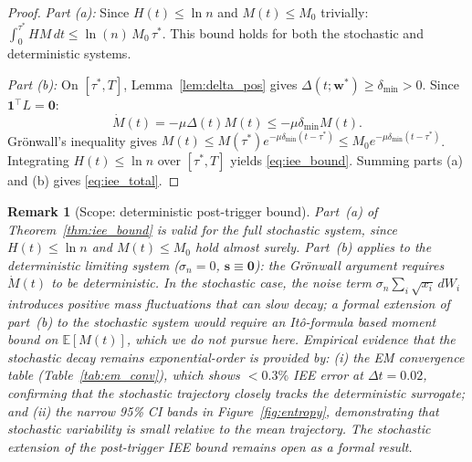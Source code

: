 \documentclass[review,12pt]{elsarticle}
\newcommand{\bfw}{\mathbf{w}}
\newtheorem{remark}{Remark}
\begin{document}
\begin{proof}
\emph{Part (a):} Since $H(t) \leq \ln n$ and $M(t) \leq M_0$ trivially:
$\int_0^{\tau^*} H M\,dt \leq \ln(n)\,M_0\,\tau^*$.
This bound holds for both the stochastic and deterministic systems.

\emph{Part (b):} On $[\tau^*,T]$, Lemma~\ref{lem:delta_pos} gives
$\Delta(t;\bfw^*) \geq \delta_{\min} > 0$.
Since $\mathbf{1}^\top L = \mathbf{0}$:
\[
  \dot{M}(t) = -\mu\Delta(t)M(t) \leq -\mu\delta_{\min}M(t).
\]
Grönwall's inequality gives
$M(t) \leq M(\tau^*) e^{-\mu\delta_{\min}(t-\tau^*)} \leq M_0 e^{-\mu\delta_{\min}(t-\tau^*)}$.
Integrating $H(t) \leq \ln n$ over $[\tau^*, T]$ yields \eqref{eq:iee_bound}.
Summing parts (a) and (b) gives \eqref{eq:iee_total}.
\end{proof}

\begin{remark}[Scope: deterministic post-trigger bound]
\label{rem:det_bound}
Part~(a) of Theorem~\ref{thm:iee_bound} is valid for the full stochastic
system, since $H(t) \leq \ln n$ and $M(t) \leq M_0$ hold almost surely.
Part~(b) applies to the \emph{deterministic limiting system}
($\sigma_n = 0$, $\mathbf{s} \equiv \mathbf{0}$): the Grönwall argument
requires $\dot{M}(t)$ to be deterministic. In the stochastic case,
the noise term $\sigma_n\sum_i\sqrt{x_i}\,dW_i$ introduces positive mass
fluctuations that can slow decay; a formal extension of part~(b) to the
stochastic system would require an It\^{o}-formula based moment bound on
$\mathbb{E}[M(t)]$, which we do not pursue here. Empirical evidence that
the stochastic decay remains exponential-order is provided by:
(i) the EM convergence table (Table~\ref{tab:em_conv}), which shows
$<0.3\%$ IEE error at $\Delta t = 0.02$, confirming that the stochastic
trajectory closely tracks the deterministic surrogate; and
(ii) the narrow 95\% CI bands in Figure~\ref{fig:entropy}, demonstrating
that stochastic variability is small relative to the mean trajectory.
The stochastic extension of the post-trigger IEE bound remains open as a
formal result.
\end{remark}
\end{document}
